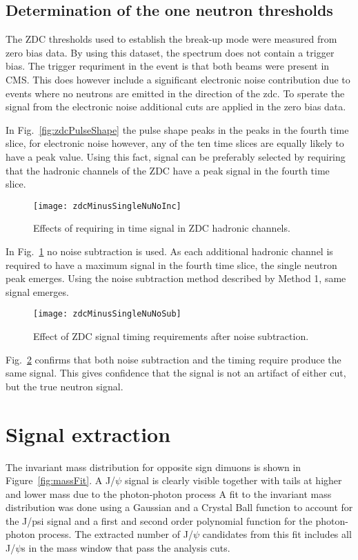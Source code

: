     \subsection{Determination of the one neutron thresholds}
      The ZDC thresholds used to establish the break-up mode were measured from
        zero bias data.
      By using this dataset, the spectrum does not contain a trigger bias. 
      The trigger requriment in the event is that both beams were present in 
        CMS.
      This does however include a significant electronic noise contribution due
        to events where no neutrons are emitted in the direction of the zdc.
      To sperate the signal from the electronic noise additional cuts are 
        applied in the zero bias data.

      In Fig.~\ref{fig:zdcPulseShape} the pulse shape peaks in the peaks in the
        fourth time slice, for electronic noise however, any of the ten time 
        slices are equally likely to have a peak value.
      Using this fact, signal can be preferably selected by requiring that the
        hadronic channels of the ZDC have a peak signal in the fourth time 
        slice.
      \begin{figure}[h]
        \centering
        \texttt{[image: zdcMinusSingleNuNoInc]}
        \caption{Effects of requiring in time signal in ZDC hadronic 
          channels.}
        \label{fig:zdcTimingCuts}
      \end{figure}
      In Fig.~\ref{fig:zdcTimingCuts} no noise subtraction is used. 
      As each additional hadronic channel is required to have a maximum signal
        in the fourth time slice, the single neutron peak emerges. 
      Using the noise subtraction method described by Method 1, same signal
        emerges.
      \begin{figure}[h]
        \centering
        \texttt{[image: zdcMinusSingleNuNoSub]}
        \caption{Effect of ZDC signal timing requirements after noise 
          subtraction.}
        \label{fig:zdcTimingAfterNoiseSub}
      \end{figure}
      Fig.~\ref{fig:zdcTimingAfterNoiseSub} confirms that both noise 
        subtraction and the timing require produce the same signal.
      This gives confidence that the signal is not an artifact of either cut, 
        but the true neutron signal. 

  \section{Signal extraction}
    The invariant mass distribution for opposite sign dimuons is shown in 
      Figure~\ref{fig:massFit}. 
    A J/$\psi$ signal is clearly visible together with tails at higher and lower mass
      due to the photon-photon process
    A fit to the invariant mass distribution was done using a Gaussian and a Crystal Ball
      function to account for the J/psi signal and a first and second order polynomial 
      function for the photon-photon process.
    The extracted number of J/$\psi$ candidates from this fit includes all J/$\psi$s in
      the mass window that pass the analysis cuts. 
    
